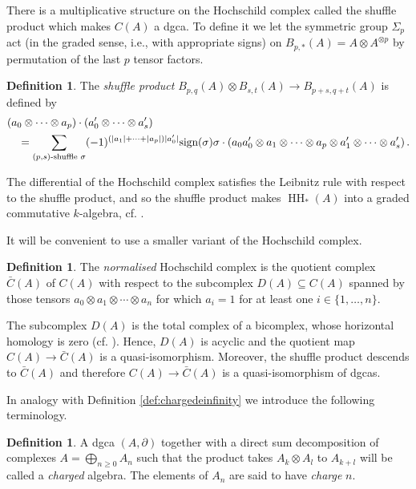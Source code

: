 \documentclass[oneside, a4paper, 12pt]{article}
\numberwithin{equation}{section}
\DeclareMathOperator{\HH}{HH}
\theoremstyle{plain}
\theoremstyle{definition}
\newtheorem{definition}[theorem]{Definition}
\theoremstyle{remark}
\begin{document}
There is a multiplicative structure on the Hochschild complex called the shuffle product which makes $C(A)$ a dgca. To define it we let the symmetric group $\Sigma_p$ act (in the graded sense, i.e., with appropriate signs) on $B_{p,\ast}(A)=A\otimes A^{\otimes p}$ by permutation of the last $p$ tensor factors.

\begin{definition} \label{def:shuffleproduct}
The \emph{shuffle product} $B_{p,q}(A)\otimes B_{s,t}(A)\to B_{p+s,q+t}(A)$ is defined by
\begin{equation*}
\begin{split}
&(a_0\otimes \cdots \otimes a_p)\cdot (a_{0}'\otimes \cdots \otimes a_{s}')\\&\quad =\sum_{(p,s)\textnormal{-shuffle } \sigma} (-1)^{(|a_1|+\cdots +|a_p|)|a_{0}'|} \textnormal{sign}(\sigma) \sigma\cdot (a_0a_{0}'\otimes a_1 \otimes \cdots \otimes a_p\otimes a_{1}'\otimes \cdots \otimes a_{s}')\, .
\end{split}
\end{equation*}
\end{definition}

The differential of the Hochschild complex satisfies the Leibnitz rule with respect to the shuffle product, and so the shuffle product makes $\HH_\ast(A)$ into a graded commutative $k$-algebra, cf. \cite[4.2.1]{Loday}.


It will be convenient to use a smaller variant of the Hochschild complex.
\begin{definition} \label{def:normalised}
The \emph{normalised} Hochschild complex is the quotient complex $\bar{C}(A)$ of $C(A)$ with respect to the subcomplex $D(A)\subseteq C(A)$ spanned by those tensors $a_0\otimes a_1\otimes \cdots \otimes a_n$ for which $a_i=1$ for at least one $i\in \{1,\dots,n\}$.
\end{definition}

The subcomplex $D(A)$ is the total complex of a bicomplex, whose horizontal homology is zero (cf. \cite[1.1.15]{Loday}). Hence, $D(A)$ is acyclic and the quotient map $C(A)\to \bar{C}(A)$ is a quasi-isomorphism. Moreover, the shuffle product descends to $\bar{C}(A)$ and therefore $C(A)\to \bar{C}(A)$ is a quasi-isomorphism of dgcas.

In analogy with Definition \ref{def:chargedeinfinity} we introduce the following terminology.
\begin{definition} \label{def:chargedalgebra}
A dgca $(A,\partial)$ together with a direct sum decomposition of complexes $A=\bigoplus_{n\geq 0} A_n$ such that the product takes $A_k \otimes A_l$ to $A_{k+l}$ will be called a \emph{charged} algebra. The elements of $A_n$ are said to have \emph{charge} $n$.
\end{definition}
\end{document}
